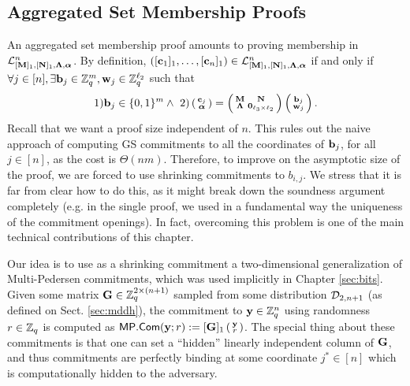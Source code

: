 \subsection{Aggregated Set Membership Proofs}
An aggregated set membership proof amounts to proving membership in $\mathcal{L}_{[\mathbf{{M}}]_1,[\mathbf{{N}}]_1,\mathbf{{\Lambda}},{\boldsymbol \alpha}}^n$. By definition, $([\mathbf{c}_1]_1,\ldots, [\mathbf{c}_n]_1) \in\mathcal{L}_{[\mathbf{{M}}]_1,[\mathbf{{N}}]_1,\mathbf{{\Lambda}},{\boldsymbol \alpha}}^n$ if and only if  $\forall j \in [n], \exists \mathbf{b}_j\in \mathbb{Z}_q^{m},\mathbf{w}_j\in\mathbb{Z}_q^{\ell_2}$ such that
$$
 1) \mathbf{b}_j\in \{0,1\}^{m}
  \wedge \ 2)
\left(\begin{smallmatrix}
    \mathbf{c}_j\\
    {\boldsymbol \alpha}
\end{smallmatrix}\right)
=
\left(\begin{smallmatrix}
    \mathbf{{M}}       & \mathbf{{N}}\\
    \mathbf{{\Lambda}} & \mathbf{{0}}_{{\ell_3}\times {\ell_2}}
\end{smallmatrix}\right)
\left(\begin{smallmatrix}
    \mathbf{b}_j\\
    \mathbf{w}_j
\end{smallmatrix}\right).
$$
Recall that we want a proof size independent of $n$. This rules out the naive approach of computing GS commitments to all the coordinates of $\mathbf{b}_j$, for all $j \in [n]$, as the cost is $\Theta(nm)$. Therefore, to improve on the asymptotic size of the proof, we are forced to use shrinking commitments to $b_{i,j}$. We stress that it is far from clear how to do this, as it might break down the soundness argument completely (e.g. in the single proof, we used in a fundamental way the uniqueness of the commitment openings). In fact, overcoming this problem is one of the main technical contributions of this chapter. 

Our idea is to use as a shrinking commitment a two-dimensional generalization of Multi-Pedersen commitments, which was used implicitly in Chapter \ref{sec:bits}. Given some matrix $\mathbf{{G}} \in \mathbb{Z}_q^{2 \times (n+1)}$ sampled from some distribution $\mathcal{D}_{2,n+1}$ (as defined on Sect. \ref{sec:mddh}), the commitment to $\mathbf{y}\in\mathbb{Z}_q^n$ using randomness $r\in\mathbb{Z}_q$ is computed as $\mathsf{MP}.\mathsf{Com}(\mathbf{y};r):=[\mathbf{{G}}]_1 \left(\begin{smallmatrix}\mathbf{y} \\ r\end{smallmatrix}\right)$. The special thing about these commitments is that one can set a ``hidden'' linearly independent column of 
$\mathbf{{G}}$, and thus commitments are perfectly binding at some coordinate $j^*\in[n]$ which is computationally hidden to the adversary.

